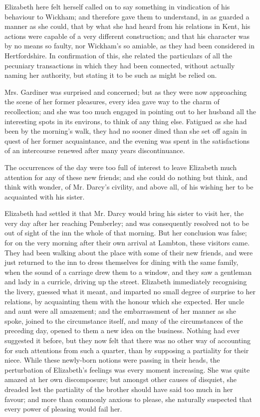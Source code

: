 Elizabeth here felt herself called on to say something
in vindication of his behaviour to Wickham; and therefore
gave them to understand, in as guarded a manner
as she could, that by what she had heard from his relations
in Kent, his actions were capable of a very different
construction; and that his character was by no means
so faulty, nor Wickham’s so amiable, as they had been
considered in Hertfordshire. In confirmation of this, she
related the particulars of all the pecuniary transactions
in which they had been connected, without actually
naming her authority, but stating it to be such as might
be relied on.

Mrs. Gardiner was surprised and concerned; but as they
were now approaching the scene of her former pleasures,
every idea gave way to the charm of recollection; and
she was too much engaged in pointing out to her husband
all the interesting spots in its environs, to think of any
thing else. Fatigued as she had been by the morning’s
walk, they had no sooner dined than she set off again in
quest of her former acquaintance, and the evening was
spent in the satisfactions of an intercourse renewed after
many years discontinuance.

The occurrences of the day were too full of interest to
leave Elizabeth much attention for any of these new
friends; and she could do nothing but think, and think
with wonder, of Mr. Darcy’s civility, and above all, of his
wishing her to be acquainted with his sister.


Elizabeth had settled it that Mr. Darcy would bring
his sister to visit her, the very day after her reaching
Pemberley; and was consequently resolved not to be out
of sight of the inn the whole of that morning. But her
conclusion was false; for on the very morning after their
own arrival at Lambton, these visitors came. They had
been walking about the place with some of their new
friends, and were just returned to the inn to dress themselves
for dining with the same family, when the sound
of a carriage drew them to a window, and they saw
a gentleman and lady in a curricle, driving up the street.
Elizabeth immediately recognising the livery, guessed
what it meant, and imparted no small degree of surprise
to her relations, by acquainting them with the honour
which she expected. Her uncle and aunt were all amazement;
and the embarrassment of her manner as she
spoke, joined to the circumstance itself, and many of the
circumstances of the preceding day, opened to them a new
idea on the business. Nothing had ever suggested it
before, but they now felt that there was no other way of
accounting for such attentions from such a quarter, than
by supposing a partiality for their niece. While these
newly-born notions were passing in their heads, the perturbation
of Elizabeth’s feelings was every moment
increasing. She was quite amazed at her own discomposure;
but amongst other causes of disquiet, she dreaded
lest the partiality of the brother should have said too
much in her favour; and more than commonly anxious
to please, she naturally suspected that every power of
pleasing would fail her.

